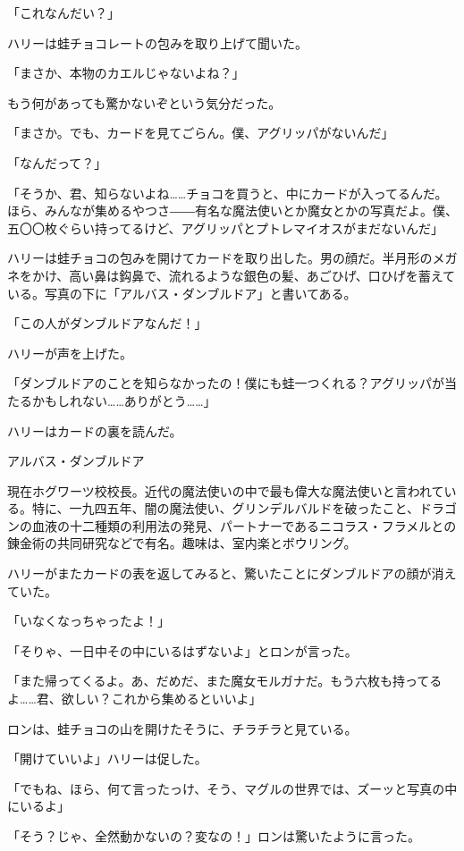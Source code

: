 \documentclass[10pt,a4paper]{article}
\begin{document}
\begin{CJK}{UTF8}{min}
「これなんだい？」

ハリーは蛙チョコレートの包みを取り上げて聞いた。

「まさか、本物のカエルじゃないよね？」

もう何があっても驚かないぞという気分だった。

「まさか。でも、カードを見てごらん。僕、アグリッパがないんだ」

「なんだって？」

「そうか、君、知らないよね……チョコを買うと、中にカードが入ってるんだ。ほら、みんなが集めるやつさ――有名な魔法使いとか魔女とかの写真だよ。僕、五〇〇枚ぐらい持ってるけど、アグリッパとプトレマイオスがまだないんだ」

ハリーは蛙チョコの包みを開けてカードを取り出した。男の顔だ。半月形のメガネをかけ、高い鼻は鈎鼻で、流れるような銀色の髪、あごひげ、口ひげを蓄えている。写真の下に「アルバス・ダンブルドア」と書いてある。

「この人がダンブルドアなんだ！」

ハリーが声を上げた。

「ダンブルドアのことを知らなかったの！僕にも蛙一つくれる？アグリッパが当たるかもしれない……ありがとう……」

ハリーはカードの裏を読んだ。



アルバス・ダンブルドア

現在ホグワーツ校校長。近代の魔法使いの中で最も偉大な魔法使いと言われている。特に、一九四五年、闇の魔法使い、グリンデルバルドを破ったこと、ドラゴンの血液の十二種類の利用法の発見、パートナーであるニコラス・フラメルとの錬金術の共同研究などで有名。趣味は、室内楽とボウリング。



ハリーがまたカードの表を返してみると、驚いたことにダンブルドアの顔が消えていた。

「いなくなっちゃったよ！」

「そりゃ、一日中その中にいるはずないよ」とロンが言った。

「また帰ってくるよ。あ、だめだ、また魔女モルガナだ。もう六枚も持ってるよ……君、欲しい？これから集めるといいよ」

ロンは、蛙チョコの山を開けたそうに、チラチラと見ている。

「開けていいよ」ハリーは促した。

「でもね、ほら、何て言ったっけ、そう、マグルの世界では、ズーッと写真の中にいるよ」

「そう？じゃ、全然動かないの？変なの！」ロンは驚いたように言った。


\end{CJK}
\end{document}
